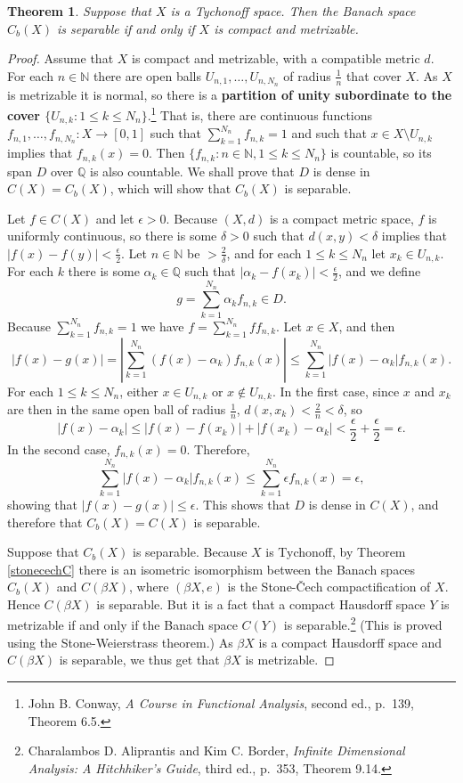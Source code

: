 \documentclass{article}
\newtheorem{theorem}{Theorem}
\theoremstyle{definition}
\begin{document}
\begin{theorem}
Suppose that $X$ is a Tychonoff space. Then the Banach space $C_b(X)$ is separable if and only if $X$ is compact and metrizable.
\end{theorem}
\begin{proof}
Assume that $X$ is compact and metrizable, with a compatible metric $d$. For each $n \in \mathbb{N}$
there are open balls $U_{n,1},\ldots,U_{n,N_n}$ of radius $\frac{1}{n}$ that cover $X$.
As $X$ is metrizable it is normal, so there is a \textbf{partition of unity subordinate to the cover $\{U_{n,k}: 1 \leq k \leq N_n\}$}.\footnote{John
B. Conway, {\em A Course in Functional Analysis}, second ed., p.~139, Theorem 6.5.} That is,
there are continuous functions $f_{n,1},\ldots,f_{n,N_n}:X \to [0,1]$ such that
$\sum_{k=1}^{N_n} f_{n,k}=1$ and such that  $x \in X \setminus U_{n,k}$ implies that $f_{n,k}(x)=0$. Then
$\{f_{n,k}: n \in \mathbb{N}, 1 \leq k \leq N_n\}$ is countable, so its span $D$ over $\mathbb{Q}$ is also countable. 
We shall prove that $D$ is dense in $C(X)=C_b(X)$, which will show that $C_b(X)$ is separable.

Let $f\in C(X)$ and let $\epsilon>0$. Because $(X,d)$ is a compact metric space, $f$ is uniformly continuous, so there is some
$\delta>0$ such that $d(x,y)<\delta$ implies that $|f(x)-f(y)|<\frac{\epsilon}{2}$. Let $n\in \mathbb{N}$ be $>\frac{2}{\delta}$, and for
each $1 \leq k \leq N_n$ let $x_k \in U_{n,k}$. For each $k$ there is some $\alpha_k \in \mathbb{Q}$ such that
$|\alpha_k - f(x_k)|<\frac{\epsilon}{2}$, and we define 
\[
g = \sum_{k=1}^{N_n} \alpha_k f_{n,k} \in D.
\]
Because $\sum_{k=1}^{N_n} f_{n,k}=1$ we have $f= \sum_{k=1}^{N_n} f f_{n,k}$. Let $x \in X$, and then
\[
|f(x)-g(x)|=\left| \sum_{k=1}^{N_n} (f(x)-\alpha_k) f_{n,k}(x) \right|
\leq \sum_{k=1}^{N_n} |f(x)-\alpha_k| f_{n,k}(x).
\]
For each $1 \leq k \leq N_n$, either $x \in U_{n,k}$ or $x \not \in U_{n,k}$. In the first case,
since $x$ and $x_k$ are then in the same open ball of radius $\frac{1}{n}$, $d(x,x_k) < \frac{2}{n}<\delta$, so
\[
|f(x)-\alpha_k| \leq |f(x)-f(x_k)| + |f(x_k)-\alpha_k| < \frac{\epsilon}{2}+\frac{\epsilon}{2}=\epsilon.
\]
In the second case, $f_{n,k}(x)=0$. Therefore,
\[
 \sum_{k=1}^{N_n} |f(x)-\alpha_k| f_{n,k}(x) \leq \sum_{k=1}^{N_n} \epsilon f_{n,k}(x) 
 =\epsilon,
\]
showing that $|f(x)-g(x)| \leq \epsilon$. This shows that $D$ is dense in $C(X)$, and therefore that $C_b(X)=C(X)$ is separable.


Suppose that $C_b(X)$ is separable.
Because $X$ is Tychonoff, by Theorem \ref{stonecechC} there is an isometric isomorphism between the Banach spaces
$C_b(X)$ and  $C(\beta X)$, where $(\beta X,e)$ is the Stone-\v{C}ech compactification of $X$.
Hence $C(\beta X)$ is separable.
But it is a fact that a compact Hausdorff space $Y$ is metrizable if and only if the Banach space $C(Y)$ is separable.\footnote{Charalambos D. 
Aliprantis and Kim C. Border, {\em Infinite Dimensional Analysis: A Hitchhiker's Guide}, third ed., p.~353, Theorem 9.14.}
(This is proved using the Stone-Weierstrass theorem.)
As $\beta X$ is a compact Hausdorff space and $C(\beta X)$ is separable, we thus get that $\beta X$ is metrizable. 



\end{proof}
\end{document}
